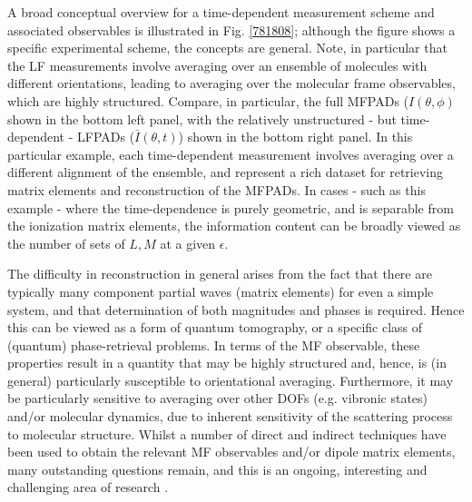 A broad conceptual overview for a time-dependent measurement scheme and associated observables is illustrated in Fig. \ref{781808}; although the figure shows a specific experimental scheme, the concepts are general. Note, in particular that the LF measurements involve averaging over an ensemble of molecules with different orientations, leading to averaging over the molecular frame observables, which are highly structured. Compare, in particular, the full MFPADs ($I(\theta,\phi)$ shown in the bottom left panel, with the relatively unstructured - but time-dependent - LFPADs ($\bar{I}(\theta,t)$) shown in the bottom right panel. In this particular example, each time-dependent measurement involves averaging over a different alignment of the ensemble, and represent a rich dataset for retrieving matrix elements and reconstruction of the MFPADs. In cases - such as this example - where the time-dependence is purely geometric, and is separable from the ionization matrix elements, the information content can be broadly viewed as the number of sets of ${L,M}$ at a given $\epsilon$.

The difficulty in reconstruction in general arises from the fact that there are typically many component partial waves (matrix elements) for even a simple system, and that determination of both magnitudes and phases is required. Hence this can be viewed as a form of quantum tomography, or a specific class of (quantum) phase-retrieval problems. In terms of the MF observable, these properties result in a quantity that may be highly structured and, hence, is (in general) particularly susceptible to orientational averaging. Furthermore, it may be particularly sensitive to averaging over other DOFs (e.g. vibronic states) and/or molecular dynamics, due to inherent sensitivity of the scattering process to molecular structure. Whilst a number of direct and indirect techniques have been used to obtain the relevant MF observables and/or dipole matrix elements, many outstanding questions remain, and this is an ongoing, interesting and challenging area of research \cite{hockett2018QuantumMetrologyPhotoelectrons,hockett2018QuantumMetrologyPhotoelectronsa}.
